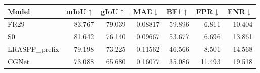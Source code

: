 \par\medskip\noindent\begin{minipage}{\linewidth}
\centering\small\setlength{\tabcolsep}{3pt}
\label{tab:development}
\begin{tabular}{lrrrrrr}
\toprule
Model & mIoU$\uparrow$ & gIoU$\uparrow$ & MAE$\downarrow$ & BF1$\uparrow$ & FPR$\downarrow$ & FNR$\downarrow$\\\midrule

FR29 & 83.767 & 79.039 & 0.08817 & 59.896 & 6.811 & 10.404\\
S0 & 81.642 & 76.140 & 0.09667 & 53.677 & 6.696 & 13.861\\
LRASPP\_prefix & 79.198 & 73.225 & 0.11562 & 46.566 & 8.501 & 14.568\\
CGNet & 73.088 & 65.680 & 0.16077 & 35.086 & 11.493 & 19.518\\
\bottomrule
\end{tabular}
\end{minipage}\par\medskip
